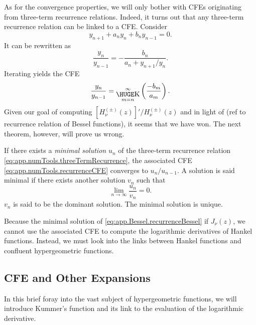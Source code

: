 As for the convergence properties, we will only bother with CFEs 
originating from three-term recurrence relations. Indeed, it turns out
that any three-term recurrence relation can be linked to a CFE. 
Consider  
  \begin{equation}
    \label{eq:app.numTools.threeTermRecurrence}
   y_{n+1} + a_ny_n + b_ny_{n-1} = 0. 
  \end{equation}
It can be rewritten as
  \begin{equation}
    \frac{y_n}{y_{n-1}} = -\frac{b_n}{a_n+y_{n+1}/y_n}.
  \end{equation}
Iterating yields the CFE
  \begin{equation}
   \label{eq:app.numTools.recurrenceCFE}
   \frac{y_n}{y_{n-1}} = \bigk_{m=n}^\infty\left(\frac{-b_m}{a_m}\right).
  \end{equation}
Given our goal of computing $[H^{(\pm)}_\nu(z)]'/H^{(\pm)}_\nu(z)$
and in light of (ref to recurrence relation of Bessel functions), it seems that
we have won. The next theorem, however, will prove us wrong.
   \begin{thm}
    If there exists a \textit{minimal solution} $u_n$ of the three-term
    recurrence relation \eqref{eq:app.numTools.threeTermRecurrence}, 
    the associated CFE \eqref{eq:app.numTools.recurrenceCFE} converges
    to $u_n/u_{n-1}$. A solution is said minimal if there exists another
    solution $v_n$ such that
      \begin{equation}
       \lim_{n\rightarrow\infty} \frac{u_n}{v_n} = 0.
      \end{equation}
    $v_n$ is said to be the dominant solution. The minimal solution is unique. 
   \end{thm}

Because the minimal solution of \eqref{eq:app.Bessel.recurrenceBessel} if $J_\nu(z)$, 
we cannot use the associated CFE to compute the logarithmic derivatives
of Hankel functions. Instead, we must look into the links between
Hankel functions and confluent hypergeometric functions. 

\subsection{CFE and Other Expansions}
In this brief foray into the vast subject
of hypergeometric functions, we will introduce Kummer's 
function and its link to the evaluation of the logarithmic
derivative.

